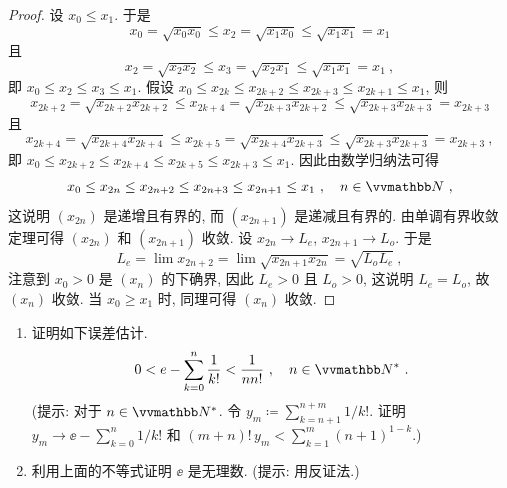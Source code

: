 \begin{proof}
    设 \(x_0 \leq x_1\). 于是
    \[
        x_0 = \sqrt{x_0 x_0} \leq x_2 = \sqrt{x_1 x_0} \leq \sqrt{x_1 x_1} = x_1
    \]
    且
    \[
        x_2 = \sqrt{x_2 x_2} \leq x_3 = \sqrt{x_2 x_1} \leq \sqrt{x_1 x_1} = x_1\ ,
    \]
    即 \(x_0 \leq x_2 \leq x_3 \leq x_1\). 假设 \(x_0 \leq x_{2 k} \leq x_{2 k + 2} \leq x_{2 k + 3} \leq x_{2 k + 1} \leq x_1\), 则
    \[
        x_{2 k + 2} = \sqrt{x_{2 k + 2} x_{2 k + 2}} \leq x_{2 k + 4} = \sqrt{x_{2 k + 3} x_{2 k + 2}} \leq \sqrt{x_{2 k + 3} x_{2 k + 3}} = x_{2 k + 3}
    \]
    且
    \[
        x_{2 k + 4} = \sqrt{x_{2 k + 4} x_{2 k + 4}} \leq x_{2 k + 5} = \sqrt{x_{2 k + 4} x_{2 k + 3}} \leq \sqrt{x_{2 k + 3} x_{2 k + 3}} = x_{2 k + 3}\ ,
    \]
    即 \(x_0 \leq x_{2 k + 2} \leq x_{2 k + 4} \leq x_{2 k + 5} \leq x_{2 k + 3} \leq x_1\). 因此由数学归纳法可得
    \[
        x_0 \leq x_{2 n} \leq x_{2 n + 2} \leq x_{2 n + 3} \leq x_{2 n + 1} \leq x_1\ ,\quad n \in \N\ ,
    \]
    这说明 \((x_{2 n})\) 是递增且有界的, 而 \((x_{2 n + 1})\) 是递减且有界的. 由单调有界收敛定理可得 \((x_{2 n})\) 和 \((x_{2 n + 1})\) 收敛. 设 \(x_{2 n} \to L_e\), \(x_{2 n + 1} \to L_o\). 于是
    \[
        L_e = \lim x_{2 n + 2} = \lim \sqrt{x_{2 n + 1} x_{2 n}} = \sqrt{L_o L_e}\ ,
    \]
    注意到 \(x_0 > 0\) 是 \((x_n)\) 的下确界, 因此 \(L_e > 0\) 且 \(L_o > 0\), 这说明 \(L_e = L_o\), 故 \((x_n)\) 收敛. 当 \(x_0 \geq x_1\) 时, 同理可得 \((x_n)\) 收敛.
\end{proof}

\begin{exercise}\label{ex:e-error-estimate}
    \begin{enumerate}
        \item 证明如下误差估计.
        \[
            0 < \ee - \sum_{k = 0}^n \frac{1}{k!} < \frac{1}{n n!}\ ,\quad n \in \N^\ast\ .
        \]
        (提示: 对于 \(n \in \N^\ast\). 令 \(y_m \coloneqq \sum_{k = n + 1}^{n + m} 1 / k!\). 证明 \(y_m \to \ee - \sum_{k = 0}^n 1 / k!\) 和 \((m + n)!\, y_m < \sum_{k = 1}^m (n + 1)^{1 - k}\).)
        \item 利用上面的不等式证明 \(\ee\) 是无理数. (提示: 用反证法.)
    \end{enumerate}
\end{exercise}

